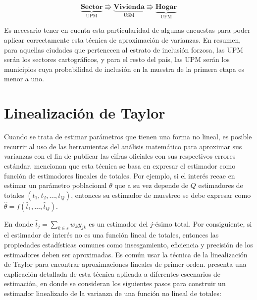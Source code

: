 \documentclass[
  12pt,
  spanish,
]{book}
\begin{document}
\begin{equation*}
\underbrace{\textbf{Sector}}_{\text{UPM}} \Rrightarrow
\underbrace{\textbf{Vivienda}}_{\text{USM}} \Rrightarrow
\underbrace{\textbf{Hogar}}_{\text{UFM}}
\end{equation*}

Es necesario tener en cuenta esta particularidad de algunas encuestas para poder aplicar correctamente esta técnica de aproximación de varianzas. En resumen, para aquellas ciudades que pertenecen al estrato de inclusión forzosa, las UPM serán los sectores cartográficos, y para el resto del país, las UPM serán los municipios cuya probabilidad de inclusión en la muestra de la primera etapa es menor a uno.

\hypertarget{linealizaciuxf3n-de-taylor}{%
\section{Linealización de Taylor}\label{linealizaciuxf3n-de-taylor}}

Cuando se trata de estimar parámetros que tienen una forma no lineal, es posible recurrir al uso de las herramientas del análisis matemático para aproximar sus varianzas con el fin de publicar las cifras oficiales con sus respectivos errores estándar. \citet{Valliant_Dever_Kreuter_2013} mencionan que esta técnica se basa en expresar el estimador como función de estimadores lineales de totales. Por ejemplo, si el interés recae en estimar un parámetro poblacional \(\theta\) que a su vez depende de \(Q\) estimadores de totales \((t_1, t_2, \ldots, t_Q)\), entonces su estimador de muestreo se debe expresar como \(\hat{\theta}=f(\hat{t}_1, \ldots, \hat{t}_Q)\).

En donde \(\hat{t}_j=\sum_{k\in s}w_k y_{jk}\) es un estimador del \(j\)-ésimo total. Por consiguiente, si el estimador de interés no es una función lineal de totales, entonces las propiedades estadísticas comunes como insesgamiento, eficiencia y precisión de los estimadores deben ser aproximadas. Es común usar la técnica de la linealización de Taylor para encontrar aproximaciones lineales de primer orden. \citet[capitulo 8]{Gutierrez_2016} presenta una explicación detallada de esta técnica aplicada a diferentes escenarios de estimación, en donde se consideran los siguientes pasos para construir un estimador linealizado de la varianza de una función no lineal de totales:
\end{document}
